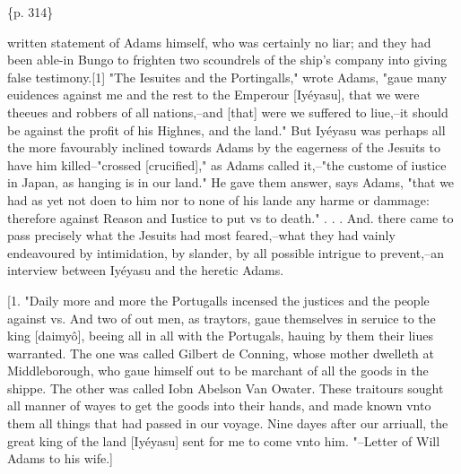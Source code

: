 \{p. 314\}

written statement of Adams himself, who was certainly no liar; and they had been able-in Bungo to frighten two scoundrels of the ship's company into giving false testimony.[1] "The Iesuites and the Portingalls," wrote Adams, "gaue many euidences against me and the rest to the Emperour [Iyéyasu], that we were theeues and robbers of all nations,--and [that] were we suffered to liue,--it should be against the profit of his Highnes, and the land." But Iyéyasu was perhaps all the more favourably inclined towards Adams by the eagerness of the Jesuits to have him killed--"crossed [crucified]," as Adams called it,--"the custome of iustice in Japan, as hanging is in our land." He gave them answer, says Adams, "that we had as yet not doen to him nor to none of his lande any harme or dammage: therefore against Reason and Iustice to put vs to death." . . . And. there came to pass precisely what the Jesuits had most feared,--what they had vainly endeavoured by intimidation, by slander, by all possible intrigue to prevent,--an interview between Iyéyasu and the heretic Adams.

[1. "Daily more and more the Portugalls incensed the justices and the people against vs. And two of out men, as traytors, gaue themselves in seruice to the king [daimyô], beeing all in all with the Portugals, hauing by them their liues warranted. The one was called Gilbert de Conning, whose mother dwelleth at Middleborough, who gaue himself out to be marchant of all the goods in the shippe. The other was called Iobn Abelson Van Owater. These traitours sought all manner of wayes to get the goods into their hands, and made known vnto them all things that had passed in our voyage. Nine dayes after our arriuall, the great king of the land [Iyéyasu] sent for me to come vnto him. "--Letter of Will Adams to his wife.]

